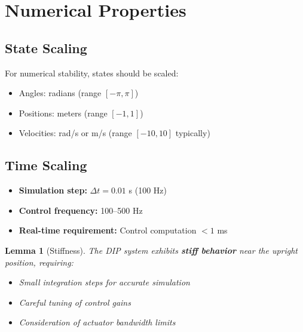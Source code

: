 \documentclass[11pt,a4paper]{article}
\newtheorem{lemma}{Lemma}[section]
\begin{document}

\section{Numerical Properties}

\subsection{State Scaling}

For numerical stability, states should be scaled:
\begin{itemize}
    \item Angles: radians (range $[-\pi, \pi]$)
    \item Positions: meters (range $[-1, 1]$)
    \item Velocities: rad/s or m/s (range $[-10, 10]$ typically)
\end{itemize}

\subsection{Time Scaling}

\begin{itemize}
    \item \textbf{Simulation step:} $\Delta t = 0.01$ s (100 Hz)
    \item \textbf{Control frequency:} 100--500 Hz
    \item \textbf{Real-time requirement:} Control computation $< 1$ ms
\end{itemize}

\begin{lemma}[Stiffness]
The DIP system exhibits \textbf{stiff behavior} near the upright position, requiring:
\begin{itemize}
    \item Small integration steps for accurate simulation
    \item Careful tuning of control gains
    \item Consideration of actuator bandwidth limits
\end{itemize}
\end{lemma}

\end{document}
